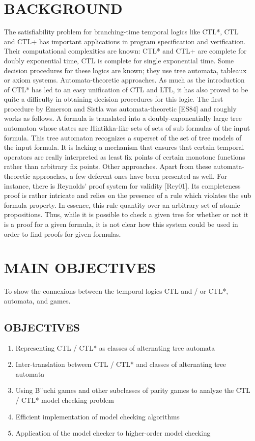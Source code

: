 \documentclass[12pt,letterpaper]{article}
\begin{document}
{\section{BACKGROUND}
The satisfiability problem for branching-time temporal logics like CTL*, CTL and CTL+ has important applications in program specification and verification. Their computational complexities are known: CTL* and CTL+ are complete for doubly exponential time, CTL is complete for single exponential time. Some decision procedures for these logics are known; they use tree automata, tableaux or axiom systems.
Automata-theoretic approaches. As much as the introduction of CTL* has led to an easy unification of CTL and LTL, it has also proved to be quite a difficulty in obtaining decision procedures for this logic. The first procedure by Emerson and Sistla was automata-theoretic [ES84] and roughly works as follows. A formula is translated into a doubly-exponentially large tree automaton whose states are Hintikka-like sets of sets of sub formulas of the input formula.
This tree automaton recognizes a superset of the set of tree models of the input formula. It
is lacking a mechanism that ensures that certain temporal operators are really interpreted
as least fix points of certain monotone functions rather than arbitrary fix points.
Other approaches. Apart from these automata-theoretic approaches, a few deferent ones
have been presented as well. For instance, there is Reynolds' proof system for validity
[Rey01]. Its completeness proof is rather intricate and relies on the presence of a rule which
violates the sub formula property. In essence, this rule quantity over an arbitrary set of
atomic propositions. Thus, while it is possible to check a given tree for whether or not it is
a proof for a given formula, it is not clear how this system could be used in order to
find proofs for given formulas.


\section{MAIN OBJECTIVES}
 To show the connexions between the temporal logics CTL and / or CTL*, automata, and games.
\subsection{OBJECTIVES}
  \begin{enumerate}
    \item Representing CTL / CTL* as classes of alternating tree automata\\
    \item Inter-translation between CTL / CTL* and classes of alternating tree automata\\
    \item Using B¨uchi games and other subclasses of parity games to analyze the CTL / CTL* model checking problem\\
    \item Efficient implementation of model checking algorithms\\
    \item Application of the model checker to higher-order model checking\\
  \end{enumerate}
}
\end{document}
